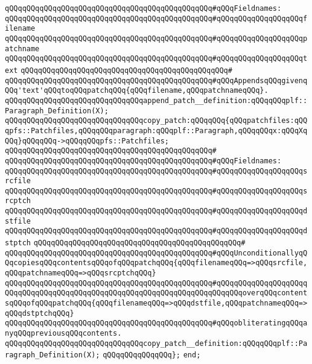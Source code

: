 \verb|qQQqqQQqqQQqqQQqqQQqqQQqqQQqqQQqqQQqqQQqqQQqqQQq#qQQqFieldnames:|\newline
\verb|qQQqqQQqqQQqqQQqqQQqqQQqqQQqqQQqqQQqqQQqqQQqqQQq#qQQqqQQqqQQqqQQqqQQqfilename|\newline
\verb|qQQqqQQqqQQqqQQqqQQqqQQqqQQqqQQqqQQqqQQqqQQqqQQq#qQQqqQQqqQQqqQQqqQQqpatchname|\newline
\verb|qQQqqQQqqQQqqQQqqQQqqQQqqQQqqQQqqQQqqQQqqQQqqQQq#qQQqqQQqqQQqqQQqqQQqtext|\newline
\verb|qQQqqQQqqQQqqQQqqQQqqQQqqQQqqQQqqQQqqQQqqQQqqQQq#|\newline
\verb|qQQqqQQqqQQqqQQqqQQqqQQqqQQqqQQqqQQqqQQqqQQqqQQq#qQQqAppendsqQQqgivenqQQq'text'qQQqtoqQQqpatchqQQq{qQQqfilename,qQQqpatchnameqQQq}.|\newline
\newline
\verb|qQQqqQQqqQQqqQQqqQQqqQQqqQQqqQQqappend_patch__definition:qQQqqQQqplf::Paragraph_Definition(X);|\newline
\newline
\newline
\newline
\verb|qQQqqQQqqQQqqQQqqQQqqQQqqQQqqQQqcopy_patch:qQQqqQQq{qQQqpatchfiles:qQQqpfs::Patchfiles,qQQqqQQqparagraph:qQQqplf::Paragraph,qQQqqQQqx:qQQqXqQQq}qQQqqQQq->qQQqqQQqpfs::Patchfiles;|\newline
\verb|qQQqqQQqqQQqqQQqqQQqqQQqqQQqqQQqqQQqqQQqqQQqqQQq#|\newline
\verb|qQQqqQQqqQQqqQQqqQQqqQQqqQQqqQQqqQQqqQQqqQQqqQQq#qQQqFieldnames:|\newline
\verb|qQQqqQQqqQQqqQQqqQQqqQQqqQQqqQQqqQQqqQQqqQQqqQQq#qQQqqQQqqQQqqQQqqQQqsrcfile|\newline
\verb|qQQqqQQqqQQqqQQqqQQqqQQqqQQqqQQqqQQqqQQqqQQqqQQq#qQQqqQQqqQQqqQQqqQQqsrcptch|\newline
\verb|qQQqqQQqqQQqqQQqqQQqqQQqqQQqqQQqqQQqqQQqqQQqqQQq#qQQqqQQqqQQqqQQqqQQqdstfile|\newline
\verb|qQQqqQQqqQQqqQQqqQQqqQQqqQQqqQQqqQQqqQQqqQQqqQQq#qQQqqQQqqQQqqQQqqQQqdstptch|\newline
\verb|qQQqqQQqqQQqqQQqqQQqqQQqqQQqqQQqqQQqqQQqqQQqqQQq#|\newline
\verb|qQQqqQQqqQQqqQQqqQQqqQQqqQQqqQQqqQQqqQQqqQQqqQQq#qQQqUnconditionallyqQQqcopiesqQQqcontentsqQQqofqQQqpatchqQQq{qQQqfilenameqQQq=>qQQqsrcfile,qQQqpatchnameqQQq=>qQQqsrcptchqQQq}|\newline
\verb|qQQqqQQqqQQqqQQqqQQqqQQqqQQqqQQqqQQqqQQqqQQqqQQq#qQQqqQQqqQQqqQQqqQQqqQQqqQQqqQQqqQQqqQQqqQQqqQQqqQQqqQQqqQQqqQQqqQQqqQQqqQQqoverqQQqcontentsqQQqofqQQqpatchqQQq{qQQqfilenameqQQq=>qQQqdstfile,qQQqpatchnameqQQq=>qQQqdstptchqQQq}|\newline
\verb|qQQqqQQqqQQqqQQqqQQqqQQqqQQqqQQqqQQqqQQqqQQqqQQq#qQQqobliteratingqQQqanyqQQqpreviousqQQqcontents.|\newline
\newline
\verb|qQQqqQQqqQQqqQQqqQQqqQQqqQQqqQQqcopy_patch__definition:qQQqqQQqplf::Paragraph_Definition(X);|\newline
\verb|qQQqqQQqqQQqqQQq};|\newline
\verb|end;|\newline

